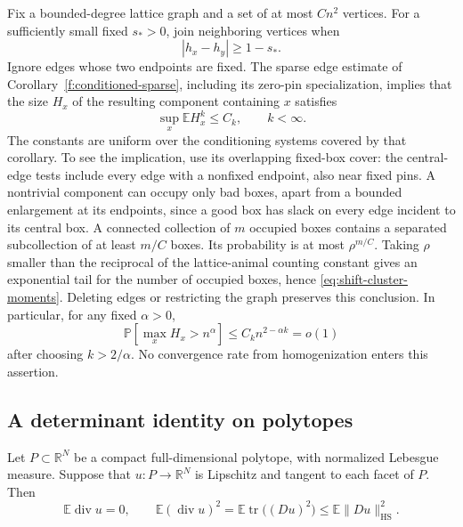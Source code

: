 Fix a bounded-degree lattice graph and a set of at most $C n^2$ vertices.
For a sufficiently small fixed $s_*>0$, join neighboring vertices when
\[
 |h_x-h_y|\geq 1-s_*.
\]
Ignore edges whose two endpoints are fixed. The sparse edge estimate of
Corollary~\ref{f:conditioned-sparse}, including its zero-pin specialization,
implies that the size $H_x$ of the resulting component containing $x$
satisfies
\begin{equation}\label{eq:shift-cluster-moments}
 \sup_x \mathbb E H_x^k\leq C_k,\qquad k<\infty.
\end{equation}
The constants are uniform over the conditioning systems covered by
that corollary. To see the implication, use its overlapping fixed-box
cover: the central-edge tests include every edge with a nonfixed endpoint,
also near fixed pins. A nontrivial component can occupy only bad boxes,
apart from a bounded enlargement at its endpoints, since a good box has
slack on every edge incident to its central box. A connected collection
of $m$ occupied boxes contains a separated subcollection of at least
$m/C$ boxes. Its probability is at most $\rho^{m/C}$. Taking $\rho$
smaller than the reciprocal of the lattice-animal counting constant
gives an exponential tail for the number of occupied boxes, hence
\eqref{eq:shift-cluster-moments}.
Deleting edges or restricting the graph preserves this conclusion.
In particular, for any fixed $\alpha>0$,
\begin{equation}\label{eq:shift-largest-cluster}
 \mathbb P\left[\max_x H_x>n^\alpha\right]
 \leq C_k n^{2-\alpha k}=o(1)
\end{equation}
after choosing $k>2/\alpha$. No convergence rate from homogenization enters
this assertion.

\subsection{A determinant identity on polytopes}

\begin{lemma}\label{lem:shift-divergence}
Let $P\subset\mathbb R^N$ be a compact full-dimensional polytope, with
normalized Lebesgue measure. Suppose that $u:P\to\mathbb R^N$ is Lipschitz
and tangent to each facet of $P$. Then
\begin{equation}\label{eq:shift-divergence}
 \mathbb E\operatorname{div}u=0,\qquad
 \mathbb E(\operatorname{div}u)^2
 =\mathbb E\operatorname{tr}\bigl((Du)^2\bigr)
 \leq\mathbb E\|Du\|_{\mathrm{HS}}^2.
\end{equation}
\end{lemma}

